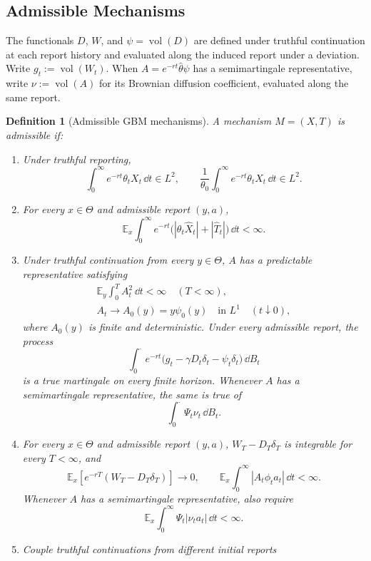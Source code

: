 \documentclass[12pt]{article}
\newtheorem{definition}{Definition}
\DeclareMathOperator{\vol}{vol}
\newcommand{\E}{\mathbb{E}}
\newcommand{\hth}{\hat\theta}
\begin{document}
\subsection{Admissible Mechanisms}
\label{app:gbm-mechanisms}

The functionals \(D\), \(W\), and \(\psi=\vol(D)\) are defined
under truthful continuation at each report history and evaluated along
the induced report under a deviation. Write \(g_t:=\vol(W_t)\).
When \(A=e^{-rt}\hth\psi\) has a semimartingale representative,
write \(\nu:=\vol(A)\) for its Brownian diffusion coefficient,
evaluated along the same report.

\begin{definition}[Admissible GBM mechanisms]
\label{def:gbm-mechanisms}
A mechanism \(M=(X,T)\) is admissible if:
\begin{enumerate}[label=\textnormal{(GM\arabic*)},leftmargin=3.3em]
\item Under truthful reporting,
\[
  \int_0^\infty e^{-rt}\theta_tX_t\,\dd t\in L^2,
  \qquad
  \frac1{\theta_0}\int_0^\infty e^{-rt}\theta_tX_t\,\dd t\in L^2.
\]
\item For every \(x\in\Theta\) and admissible report \((y,a)\),
\[
  \E_x\int_0^\infty e^{-rt}
    \bigl(|\theta_t\widehat X_t|+|\widehat T_t|\bigr)\,\dd t<\infty.
\]
\item Under truthful continuation from every \(y\in\Theta\), \(A\)
has a predictable representative satisfying
\[
\begin{gathered}
  \E_y\int_0^T A_t^2\,\dd t<\infty\quad(T<\infty),
  \\
  A_t\longrightarrow A_0(y)=y\psi_0(y)
  \quad\text{in }L^1\quad(t\downarrow0),
\end{gathered}
\]
where \(A_0(y)\) is finite and deterministic. Under every admissible
report, the process
\[
  \int_0^\cdot e^{-rt}
    \bigl(g_t-\gamma D_t\delta_t-\psi_t\delta_t\bigr)\,\dd B_t
\]
is a true martingale on every finite horizon. Whenever \(A\) has a
semimartingale representative, the same is true of
\[
  \int_0^\cdot\Psi_t\nu_t\,\dd B_t.
\]
\item For every \(x\in\Theta\) and admissible report \((y,a)\),
\(W_T-D_T\delta_T\) is integrable for every \(T<\infty\), and
\[
  \E_x[e^{-rT}(W_T-D_T\delta_T)]\longrightarrow0,
  \qquad
  \E_x\int_0^\infty|A_t\phi_ta_t|\,\dd t<\infty.
\]
Whenever \(A\) has a semimartingale representative, also require
\[
  \E_x\int_0^\infty\Psi_t|\nu_ta_t|\,\dd t<\infty.
\]
\item Couple truthful continuations from different initial reports

\end{enumerate}
\end{definition}
\end{document}
